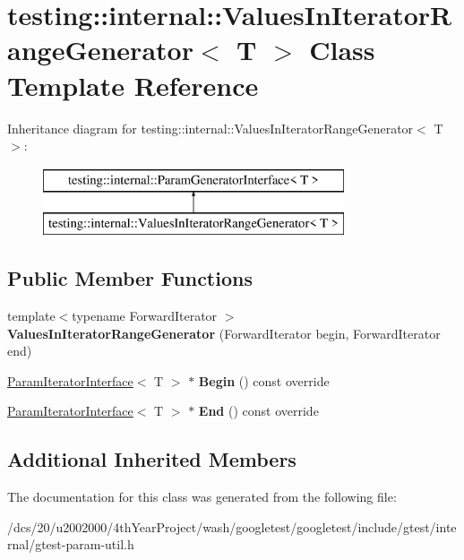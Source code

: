 \hypertarget{classtesting_1_1internal_1_1ValuesInIteratorRangeGenerator}{}\section{testing\+:\+:internal\+:\+:Values\+In\+Iterator\+Range\+Generator$<$ T $>$ Class Template Reference}
\label{classtesting_1_1internal_1_1ValuesInIteratorRangeGenerator}
Inheritance diagram for testing\+:\+:internal\+:\+:Values\+In\+Iterator\+Range\+Generator$<$ T $>$\+:\begin{figure}[H]
\begin{center}
\leavevmode
\includegraphics[height=2.000000cm]{classtesting_1_1internal_1_1ValuesInIteratorRangeGenerator}
\end{center}
\end{figure}
\subsection*{Public Member Functions}
\begin{DoxyCompactItemize}
\item 
\mbox{\label{classtesting_1_1internal_1_1ValuesInIteratorRangeGenerator_a8b30f6028bc5739bbd7c24b0f0e409f7}} 
{\footnotesize template$<$typename Forward\+Iterator $>$ }\\{\bfseries Values\+In\+Iterator\+Range\+Generator} (Forward\+Iterator begin, Forward\+Iterator end)
\item 
\mbox{\label{classtesting_1_1internal_1_1ValuesInIteratorRangeGenerator_a71ffed6f1deba05f11c9d45f6ab5b85d}} 
\mbox{\hyperlink{classtesting_1_1internal_1_1ParamIteratorInterface}{Param\+Iterator\+Interface}}$<$ T $>$ $\ast$ {\bfseries Begin} () const override
\item 
\mbox{\label{classtesting_1_1internal_1_1ValuesInIteratorRangeGenerator_a298cfb66a90b1a39c0cea3ca7ae1ece1}} 
\mbox{\hyperlink{classtesting_1_1internal_1_1ParamIteratorInterface}{Param\+Iterator\+Interface}}$<$ T $>$ $\ast$ {\bfseries End} () const override
\end{DoxyCompactItemize}
\subsection*{Additional Inherited Members}


The documentation for this class was generated from the following file\+:\begin{DoxyCompactItemize}
\item 
/dcs/20/u2002000/4th\+Year\+Project/wash/googletest/googletest/include/gtest/internal/gtest-\/param-\/util.\+h\end{DoxyCompactItemize}
